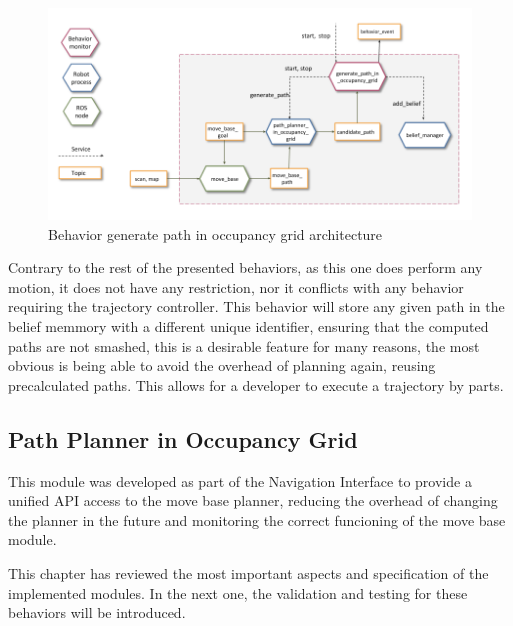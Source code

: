   \begin{figure}[h]
    \centering \includegraphics[width=\textwidth]{./Figures/BehaviorGPArquitecture.png}
    \caption{Behavior generate path in occupancy grid architecture}
    \label{ch_4:fig:behav_gp}
  \end{figure}

  Contrary to the rest of the presented behaviors, as this one does perform any motion, it does not have any restriction, nor it conflicts with any behavior requiring the trajectory controller. This behavior will store any given path in the belief memmory with a different unique identifier, ensuring that the computed paths are not smashed, this is a desirable feature for many reasons, the most obvious is being able to avoid the overhead of planning again, reusing precalculated paths. This allows for a developer to execute a trajectory by parts.

\subsection{Path Planner in Occupancy Grid} \label{ch_4:subsect:path_planner}

  This module was developed as part of the Navigation Interface to provide a unified API access to the move base planner, reducing the overhead of changing the planner in the future and monitoring the correct funcioning of the move base module.

This chapter has reviewed the most important aspects and specification of the implemented modules. In the next one, the validation and testing for these behaviors will be introduced.

